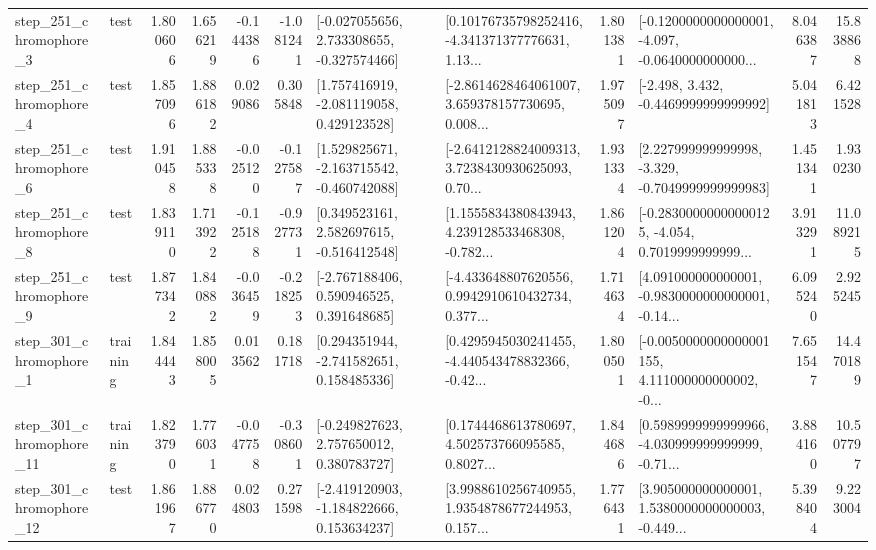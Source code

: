 \begin{tabular}{llrrrrllrlrr}
   step\_251\_chromophore\_3 &      test &      1.800606 &    1.656219 &     -0.144386 & -1.081241 &   [-0.027055656, 2.733308655, -0.327574466] &  [0.10176735798252416, -4.341371377776631, 1.13... &       1.801381 &  [-0.1200000000000001, -4.097, -0.0640000000000... &            8.046387 &         15.838868 \\
   step\_251\_chromophore\_4 &      test &      1.857096 &    1.886182 &      0.029086 &  0.305848 &    [1.757416919, -2.081119058, 0.429123528] &  [-2.8614628464061007, 3.659378157730695, 0.008... &       1.975097 &               [-2.498, 3.432, -0.4469999999999992] &            5.041813 &          6.421528 \\
   step\_251\_chromophore\_6 &      test &      1.910458 &    1.885338 &     -0.025120 & -0.127587 &   [1.529825671, -2.163715542, -0.460742088] &  [-2.6412128824009313, 3.7238430930625093, 0.70... &       1.931334 &   [2.227999999999998, -3.329, -0.7049999999999983] &            1.451341 &          1.930230 \\
   step\_251\_chromophore\_8 &      test &      1.839110 &    1.713922 &     -0.125188 & -0.927731 &    [0.349523161, 2.582697615, -0.516412548] &  [1.1555834380843943, 4.239128533468308, -0.782... &       1.861204 &  [-0.28300000000000125, -4.054, 0.7019999999999... &            3.913291 &         11.089215 \\
   step\_251\_chromophore\_9 &      test &      1.877342 &    1.840882 &     -0.036459 & -0.218253 &    [-2.767188406, 0.590946525, 0.391648685] &  [-4.433648807620556, 0.9942910610432734, 0.377... &       1.714634 &  [4.091000000000001, -0.9830000000000001, -0.14... &            6.095240 &          2.925245 \\
   step\_301\_chromophore\_1 &  training &      1.844443 &    1.858005 &      0.013562 &  0.181718 &    [0.294351944, -2.741582651, 0.158485336] &  [0.4295945030241455, -4.440543478832366, -0.42... &       1.800501 &  [-0.0050000000000001155, 4.111000000000002, -0... &            7.651547 &         14.470189 \\
  step\_301\_chromophore\_11 &  training &      1.823790 &    1.776031 &     -0.047758 & -0.308601 &    [-0.249827623, 2.757650012, 0.380783727] &  [0.1744468613780697, 4.502573766095585, 0.8027... &       1.844686 &  [0.5989999999999966, -4.030999999999999, -0.71... &            3.884160 &         10.507797 \\
  step\_301\_chromophore\_12 &      test &      1.861967 &    1.886770 &      0.024803 &  0.271598 &   [-2.419120903, -1.184822666, 0.153634237] &  [3.9988610256740955, 1.9354878677244953, 0.157... &       1.776431 &  [3.905000000000001, 1.5380000000000003, -0.449... &            5.398404 &          9.223004 \\

\end{tabular}
